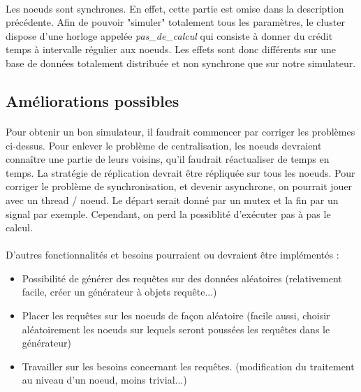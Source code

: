 \documentclass[12pt]{article}
\begin{document}
\paragraph{}Les noeuds sont synchrones. En effet, cette partie est omise dans la description précédente. Afin de pouvoir "simuler" totalement tous les paramètres, le cluster dispose d'une horloge appelée \textit{pas\_de\_calcul} qui consiste à donner du crédit temps à intervalle régulier aux noeuds. Les effets sont donc différents sur une base de données totalement distribuée et non synchrone que sur notre simulateur.

\subsection{Améliorations possibles}

\paragraph{}Pour obtenir un bon simulateur, il faudrait commencer par corriger les problèmes ci-dessus. Pour enlever le problème de centralisation, les noeuds devraient connaître une partie de leurs voisins, qu'il faudrait réactualiser de temps en temps. La stratégie de réplication devrait être répliquée sur tous les noeuds. Pour corriger le problème de synchronisation, et devenir asynchrone, on pourrait jouer avec un thread / noeud. Le départ serait donné par un mutex et la fin par un signal par exemple. Cependant, on perd la possiblité d'exécuter pas à pas le calcul.

\paragraph{}D'autres fonctionnalités et besoins pourraient ou devraient être implémentés : 

\begin{itemize}
    \item Possibilité de générer des requêtes sur des données aléatoires (relativement facile, créer un générateur à objets requête...)
    \item Placer les requêtes sur les noeuds de façon aléatoire (facile aussi, choisir aléatoirement les noeuds sur lequels seront poussées les requêtes dans le générateur)
    \item Travailler sur les besoins concernant les requêtes. (modification du traitement au niveau d'un noeud, moins trivial...)
\end{itemize}
\end{document}
